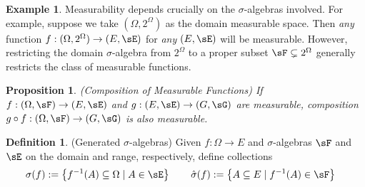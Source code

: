 \documentclass[12pt]{article}
\theoremstyle{plain}
\newtheorem{prop}[thm]{Proposition}
\theoremstyle{definition}
\newtheorem{defn}[thm]{Definition}
\newtheorem{ex}[thm]{Example}
\theoremstyle{remark}
\newcommand{\ra}{\rightarrow}
\begin{document}
\begin{ex}
Measurability depends crucially on the $\sigma$-algebras involved. For
example, suppose we take $(\Omega,2^\Omega)$ as the domain measurable
space.
Then \emph{any} function $f:(\Omega,2^\Omega)\ra (E,\sE)$ for \emph{any}
$(E,\sE)$ will be measurable.  However, restricting the domain
$\sigma$-algebra from $2^\Omega$ to a proper subset $\sF \subsetneq
2^\Omega$ generally restricts the class of measurable functions.
\end{ex}




\begin{prop}\emph{(Composition of Measurable Functions)}
\label{prop:meascomp}
If  $f:(\Omega,\sF)\ra(E,\sE)$ and $g:(E,\sE)\ra (G,\sG)$ are
measurable, composition $g\circ f: (\Omega,\sF) \ra (G,\sG)$
is also measurable.
\end{prop}

\begin{defn}(Generated $\sigma$-algebras)
Given $f:\Omega\ra E$ and $\sigma$-algebras $\sF$ and $\sE$ on the
domain and range, respectively, define collections
\begin{align*}
  \sigma(f)&:=\left\{ f^{-1}(A)  \subseteq\Omega\; |\; A \in\sE \right\}
  \qquad
  \hat{\sigma}(f) :=
  \left\{ A\subseteq E \; |\; f^{-1}(A)\in\sF \right\}
\end{align*}
\end{defn}
\end{document}
